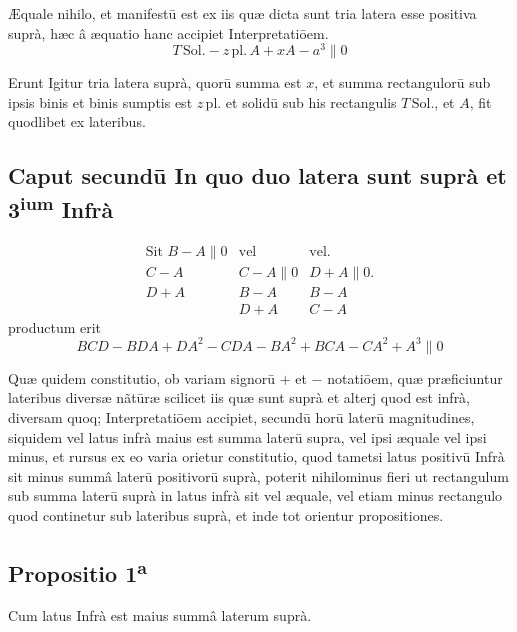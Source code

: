 \documentclass[11pt,a4paper]{article}
\begin{document}
Æquale nihilo, et manifestū est ex iis quæ dicta sunt tria latera esse positiva suprà, hæc â æquatio hanc accipiet Interpretatiōem.
\[ T\,\mathrm{Sol.} - z\,\mathrm{pl.}\,A + xA - a^{3} \parallel 0 \]

Erunt Igitur tria latera suprà, quorū summa est $x$, et summa rectangulorū sub ipsis binis et binis sumptis est $z\,\mathrm{pl.}$ et solidū sub his rectangulis $T\,\mathrm{Sol.}$, et $A$, fit quodlibet ex lateribus.

\subsection*{Caput secundū In quo duo latera sunt suprà et 3\textsuperscript{ium} Infrà}

\[ \begin{array}{lll} \text{Sit } B - A \parallel 0 & \text{vel} & \text{vel.} \\ C - A & C - A \parallel 0 & D + A \parallel 0. \\ D + A & B - A & B - A \\ & D + A & C - A \end{array} \]
productum erit
\[ BCD - BDA + DA^{2} - CDA - BA^{2} + BCA - CA^{2} + A^{3} \parallel 0 \]

Quæ quidem constitutio, ob variam signorū $+$ et $-$ notatiōem, quæ præficiuntur lateribus diversæ nãtūræ scilicet iis quæ sunt suprà et alterj quod est infrà, diversam quoq; Interpretatiōem accipiet, secundū horū laterū magnitudines, siquidem vel latus infrà maius est summa laterū supra, vel ipsi æquale vel ipsi minus, et rursus ex eo varia orietur constitutio, quod tametsi latus positivū Infrà sit minus summâ laterū positivorū suprà, poterit nihilominus fieri ut rectangulum sub summa laterū suprà in latus infrà sit vel æquale, vel etiam minus rectangulo quod continetur sub lateribus suprà, et inde tot orientur propositiones.

\subsection*{Propositio 1\textsuperscript{a}}

Cum latus Infrà est maius summâ laterum suprà.
\end{document}
